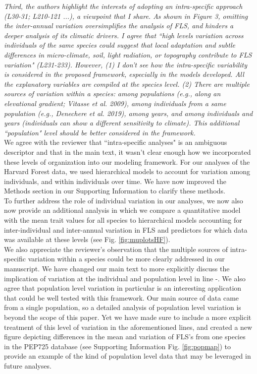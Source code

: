 \documentclass{article}[11pt]
\begin{document}
\emph{Third, the authors highlight the interests of adopting an intra-specific approach (L30-31; L210-121 ...), a viewpoint that I share. As shown in Figure 3, omitting the inter-annual variation oversimplifies the analysis of FLS, and hinders a deeper analysis of its climatic drivers. I agree that ``high levels variation across individuals of the same species could suggest that local adaptation and subtle differences in micro-climate, soil, light radiation, or topography contribute to FLS variation" (L231-233). However, (1) I don't see how the intra-specific variability is considered in the proposed framework, especially in the models developed. All the explanatory variables are compiled at the species level. (2) There are multiple sources of variation within a species: among populations (e.g., along an elevational gradient; Vitasse et al. 2009), among individuals from a same population (e.g., Denechere et al. 2019), among years, and among individuals and years (individuals can show a different sensitivity to climate). This additional ``population" level should be better considered in the framework.}\\

\noindent We agree with the reviewer that ``intra-specific analyses" is an ambiguous descriptor and that in the main text, it wasn't clear enough how we incorporated these levels of organization into our modeling framework. For our analyses of the Harvard Forest data, we used hierarchical models to account for variation among individuals, and within individuals over time. We have now improved the Methods section in our Supporting Information to clarify these methods.\\ 

\noindent To further address the role of individual variation in our analyses, we now also now provide an additional analysis in which we compare a quantitative model with the mean trait values for all species to hierarchical models accounting for inter-individual and inter-annual variation in FLS and predictors for which data was available at these levels (see Fig.  \ref{fig:muplotsHF}).\\

\indent We also appreciate the reviewer's observation that the multiple sources of intra-specific variation within a species could be more clearly addressed in our manuscript. We have changed our main text to more explicitly discuss the implication of variation at the individual and population level in line -.  We also agree that population level variation in particular is an interesting application that could be well tested with this framework. Our main source of data came from a single population, so a detailed analysis of population level variation is beyond the scope of this paper. Yet we have made sure to include a more explicit treatment of this level of variation in the aforementioned lines, and created a new figure depicting differences in the mean and variation of FLS's from one species in the PEP725 database (see Supporting Information Fig. \ref{fig:popmap}) to provide an example of the kind of population level data that may be leveraged in future analyses.\\
\end{document}
